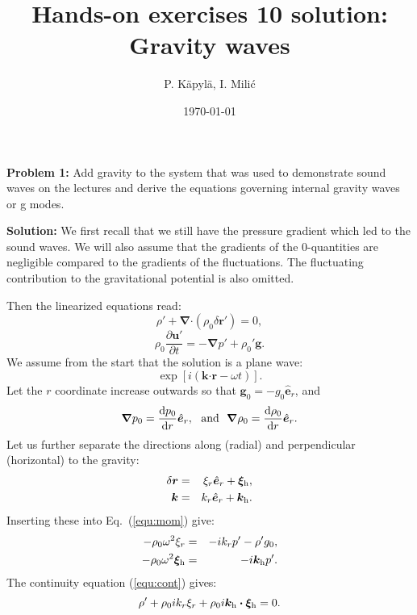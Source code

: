 \documentclass[12pt]{article}
\title{Hands-on exercises 10 solution: Gravity waves}
\author{P. K\"{a}pyl\"{a}, I. Mili\'{c}}
\date{\today}
\newcommand{\kkk}{\bm{k}}
\newcommand{\rrr}{\bm{r}}
\newcommand{\uuu}{\bm{u}}
\newcommand{\gggg}{\bm{g}}
\def\pd{\partial}
\begin{document}
\maketitle

{\bf Problem 1:} Add gravity to the system that was used to
demonstrate sound waves on the lectures and derive the equations
governing internal gravity waves or g modes.

{\bf Solution:} We first recall that we still have the pressure
gradient which led to the sound waves. We will also assume that the
gradients of the 0-quantities are negligible compared to the gradients
of the fluctuations. The fluctuating contribution to the gravitational
potential is also omitted.

Then the linearized equations read:
\begin{equation}
\rho' + \bm\nabla\bm\cdot (\rho_0\delta\rrr') = 0,\label{equ:cont}
\end{equation}
\begin{equation}
\rho_0 \frac{\pd \uuu'}{\pd t} = -\bm\nabla p' + \rho_0'\gggg.\label{equ:mom}%
\end{equation}
We assume from the start that the solution is a plane wave:
\begin{equation}
\exp [i(\kkk\bm\cdot\rrr - \omega t)].
\end{equation}
Let the $r$ coordinate increase outwards so that $\gggg_0 = -g_0
\hat{\bm e}_r$, and
\begin{equation}
\bm\nabla p_0 = \frac{{\rm d}p_0}{{\rm d}r} \hat{\bm e}_r,\ \ \mbox{and}\ \ \bm\nabla \rho_0 = \frac{{\rm d}\rho_0}{{\rm d}r} \hat{\bm e}_r.
\end{equation}
Let us further separate the directions along (radial) and
perpendicular (horizontal) to the gravity:
\begin{eqnarray}
\delta\rrr &=& \xi_r \hat{\bm e}_r + \bm\xi_{\rm h},\\
\kkk &=& k_r \hat{\bm e}_r + \kkk_{\rm h}.
\end{eqnarray}
Inserting these into Eq.~(\ref{equ:mom}) give:
\begin{eqnarray}
-\rho_0 \omega^2 \xi_r &=& -ik_rp' - \rho' g_0,\label{equ:rad}\\
-\rho_0 \omega^2 \bm\xi_{\rm h} &=& -i \kkk_{\rm h} p'.
\end{eqnarray}
The continuity equation (\ref{equ:cont}) gives:
\begin{equation}
\rho' + \rho_0 i k_r \xi_r + \rho_0 i \kkk_{\rm h}\bm\cdot\bm\xi_{\rm h} = 0.
\end{equation}
\end{document}
